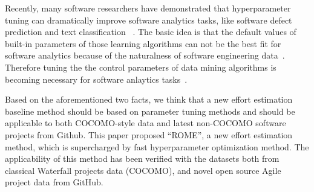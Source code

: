 \documentclass[sigconf,review,anonymous]{acmart}
\begin{document}





Recently, many software researchers have demonstrated that hyperparameter tuning can dramatically improve software analytics tasks, like software defect prediction and text classification ~\cite{agrawal2017better,AGRAWAL2018,Fu2016TuningFS,tanti18,xia2018hyperparameter, fu2017easy}. The basic idea is that the default values of built-in parameters of those learning algorithms can not be the best fit for software analytics because of the naturalness of software engineering data~\cite{fu2016differential, hindle2012naturalness}. Therefore tuning the the control parameters of data
mining algorithms is becoming necessary for software anlaytics tasks~\cite{Fu2016TuningFS,tanti18}.


Based on the aforementioned two facts, we think that a new effort estimation baseline method should be based on parameter tuning methods and should be applicable to both COCOMO-style data and latest non-COCOMO software projects from Github. This paper proposed ``ROME'', a new effort estimation method, which is supercharged by fast hyperparameter optimization method. The applicability of this method has been verified  with the datasets both from classical Waterfall projects data (COCOMO), and novel open source Agile project data from GitHub. 
\end{document}
